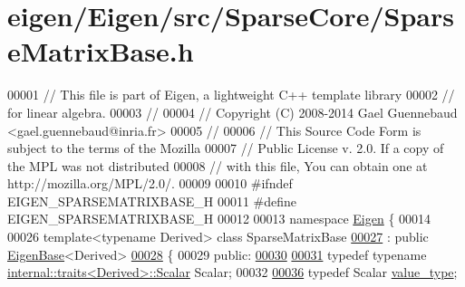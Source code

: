 \hypertarget{eigen_2_eigen_2src_2_sparse_core_2_sparse_matrix_base_8h_source}{}\section{eigen/\+Eigen/src/\+Sparse\+Core/\+Sparse\+Matrix\+Base.h}
\label{eigen_2_eigen_2src_2_sparse_core_2_sparse_matrix_base_8h_source}

\begin{DoxyCode}
00001 \textcolor{comment}{// This file is part of Eigen, a lightweight C++ template library}
00002 \textcolor{comment}{// for linear algebra.}
00003 \textcolor{comment}{//}
00004 \textcolor{comment}{// Copyright (C) 2008-2014 Gael Guennebaud <gael.guennebaud@inria.fr>}
00005 \textcolor{comment}{//}
00006 \textcolor{comment}{// This Source Code Form is subject to the terms of the Mozilla}
00007 \textcolor{comment}{// Public License v. 2.0. If a copy of the MPL was not distributed}
00008 \textcolor{comment}{// with this file, You can obtain one at http://mozilla.org/MPL/2.0/.}
00009 
00010 \textcolor{preprocessor}{#ifndef EIGEN\_SPARSEMATRIXBASE\_H}
00011 \textcolor{preprocessor}{#define EIGEN\_SPARSEMATRIXBASE\_H}
00012 
00013 \textcolor{keyword}{namespace }\hyperlink{namespace_eigen}{Eigen} \{ 
00014 
00026 \textcolor{keyword}{template}<\textcolor{keyword}{typename} Derived> \textcolor{keyword}{class }SparseMatrixBase
\hyperlink{struct_eigen_1_1_sparse_matrix_base_1_1_n_cols_block_xpr}{00027}   : \textcolor{keyword}{public} \hyperlink{group___core___module_struct_eigen_1_1_eigen_base}{EigenBase}<Derived>
\hyperlink{struct_eigen_1_1_sparse_matrix_base_1_1_const_n_cols_block_xpr}{00028} \{
00029   \textcolor{keyword}{public}:
\hyperlink{struct_eigen_1_1_sparse_matrix_base_1_1_n_rows_block_xpr}{00030} 
\hyperlink{struct_eigen_1_1_sparse_matrix_base_1_1_const_n_rows_block_xpr}{00031}     \textcolor{keyword}{typedef} \textcolor{keyword}{typename} \hyperlink{struct_eigen_1_1internal_1_1traits}{internal::traits<Derived>::Scalar} Scalar;
00032     
\hyperlink{group___sparse_core___module_ac254d3b61718ebc2136d27bac043dcb7}{00036}     \textcolor{keyword}{typedef} Scalar \hyperlink{group___sparse_core___module_ac254d3b61718ebc2136d27bac043dcb7}{value\_type};

\end{DoxyCode}
